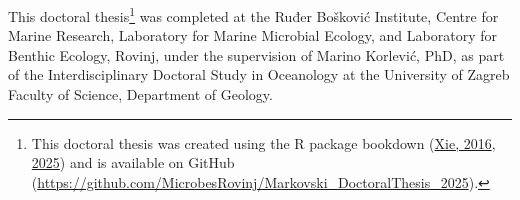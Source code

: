 \documentclass[
  12 pt,
]{book}
\begin{document}
\rmfamily


\setcounter{page}{1}



{

    
    \setlength{\topskip}{0pt}
    
    \nointerlineskip
    
    \setlength{\parskip}{0pt}
    
    \vspace*{\fill}
    
    \begin{Center}
    

This doctoral thesis\footnote{\justifying This doctoral thesis was created using the R package bookdown (\protect\hyperlink{ref-bookdown2016}{Xie, 2016}, \protect\hyperlink{ref-R-bookdown}{2025}) and is available on GitHub (\url{https://github.com/MicrobesRovinj/Markovski_DoctoralThesis_2025}).} was completed at the Ruđer Bošković Institute,
Centre for Marine Research, Laboratory for Marine Microbial Ecology, and
Laboratory for Benthic Ecology, Rovinj, under the supervision of Marino Korlević,
PhD, as part of the Interdisciplinary Doctoral Study in Oceanology at the
University of Zagreb Faculty of Science, Department of Geology.

    
    \end{Center}
    
    \vspace*{\fill}
    
}
\end{document}
